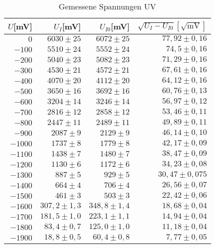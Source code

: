 \begin{table}[h]
    \centering
    \caption{Gemessene Spannungen UV}
    \begin{tabular}{r | r | r | r}
    \toprule
    $U$[mV] & $U_I$[mV] & $U_{I0}$[mV] & $\sqrt{U_I  - U_{I0}}[\sqrt{\text{mV}}]$\\
    \midrule
    $0$     &   $6030 \pm 25$   & $6072 \pm 25$& $77,92 \pm 0,16$ \\
    $-100$  &   $5510 \pm 24$   & $5552 \pm 24$& $74,5 \pm 0,16$\\
    $-200$  &   $5040 \pm 23$   & $5082 \pm 23$& $71,29 \pm 0,16$\\
    $-300$  &   $4530 \pm 21$   & $4572 \pm 21$& $67,61 \pm 0,16$\\
    $-400$  &   $4070 \pm 20$   & $4112 \pm 20$& $64,12\pm 0,16$ \\
    $-500$  &  $ 3650 \pm 16$   & $3692 \pm 16$& $60,76 \pm 0,13$ \\
    $-600$  &   $3204 \pm 14$   & $3246 \pm 14$& $56,97 \pm 0,12$ \\
    $-700$  &   $2816 \pm 12$   & $2858 \pm 12$& $53,46 \pm 0,11$ \\
    $-800$  &   $2447 \pm 11$   & $2489 \pm 11$& $49,89 \pm 0,11$\\
    $-900$  &   $2087  \pm 9$   & $2129 \pm 9$& $46,14 \pm 0,10$\\
    $-1000$  &   $1737 \pm 8$   & $1779 \pm 8$& $42,17 \pm 0,09$\\
    $-1100$ & $1438 \pm 7$      & $1480\pm 7$& $38,47 \pm 0,09$\\
    $-1200$  &  $1130 \pm 6$    & $1172 \pm 6$& $34,23 \pm 0,08$\\
    $-1300$  &  $887 \pm 5$     & $929 \pm 5$&$ 30,47 \pm 0,075$\\
    $-1400$  & $664 \pm4$       & $706 \pm 4$& $26,56 \pm 0,07$\\
    $-1500$  & $461 \pm 3$      & $503 \pm 3$& $22,42 \pm 0,06$\\
    $-1600$  & $307,2 \pm 1,3$  & $348,8 \pm 1,4$& $18,68 \pm 0,04$\\
    $-1700$  &  $181,5 \pm 1,0$ & $223,1 \pm 1,1$& $14,94 \pm 0,04$\\
    $-1800$  & $83,4 \pm 0,7$   & $125,0 \pm 1,0$& $ 11,18 \pm 0,04$\\
    $-1900$  &  $18,8 \pm 0,5$  & $60,4 \pm 0,8$& $7,77 \pm 0,05$\\
    \bottomrule
    \end{tabular}
    
\end{table}
\newpage

